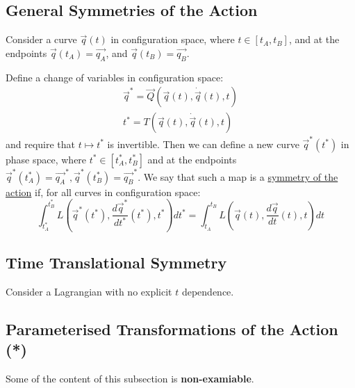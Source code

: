 \documentclass[../Main.tex]{subfiles}
\begin{document}
\subsection{General Symmetries of the Action}
Consider a curve $\vec{q}(t)$ in configuration space, where $t \in [t_A, t_B]$, and at the endpoints $\vec{q}(t_A) = \vec{q_A}$, and $\vec{q}(t_B) = \vec{q_B}$.

Define a change of variables in configuration space:
\begin{align*}
    \vec{q}^* = \vec{Q}(\vec{q}(t), \dot{\vec{q}}(t), t) \\
    t^* = T(\vec{q}(t), \dot{\vec{q}}(t), t)
\end{align*}
and require that $t \mapsto t^*$ is invertible. Then we can define a new curve $\vec{q}^*(t^*)$ in phase space, where $t^* \in [t_A^*, t_B^*]$ and at the endpoints $\vec{q}^*(t_A^*) = \vec{q_A}^*, \vec{q}^*(t_B^*) = \vec{q_B}^* $. We say that such a map is a \underline{symmetry of the action} if, for all curves in configuration space:
\begin{equation}
    \int_{t_A^*}^{t_B^*} L(\vec{q}^*(t^*), \frac{d\vec{q}^*}{dt^*}(t^*), t^*) dt^* = \int_{t_A}^{t_B} L(\vec{q}(t), \frac{d\vec{q}}{dt}(t), t) dt
    \label{eqnActionSymmetry}
\end{equation}
\subsection{Time Translational Symmetry}
Consider a Lagrangian with no explicit $t$ dependence.
\subsection{Parameterised Transformations of the Action (*)}
Some of the content of this subsection is \textbf{non-examiable}.
\end{document}
